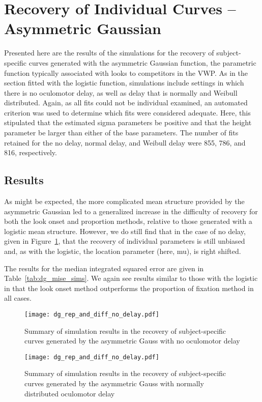 \section{Recovery of Individual Curves -- Asymmetric Gaussian}

Presented here are the results of the simulations for the recovery of subject-specific curves generated with the asymmetric Gaussian function, the parametric function typically associated with looks to competitors in the VWP. As in the section fitted with the logistic function, simulations include settings in which there is no oculomotor delay, as well as delay that is normally and Weibull distributed. Again, as all fits could not be individual examined, an automated criterion was used to determine which fits were considered  adequate. Here, this stipulated that the estimated sigma parameters be positive and that the height parameter be larger than either of the base parameters. The number of fits retained for the no delay, normal delay, and Weibull delay were  855, 786, and 816, respectively.


\subsection{Results}

As might be expected, the more complicated mean structure provided by the asymmetric Gaussian led to a generalized increase in the difficulty of recovery for both the look onset and proportion methods, relative to those generated with a logistic mean structure. However, we do still find that in the case of no delay, given in Figure~\ref{fig:dg_rep_curves_no_delay}, that the recovery of individual parameters is still unbiased and, as with the logistic, the location parameter (here, mu), is right shifted.

The results for the median integrated squared error are given in Table~\ref{tab:dg_mise_sims}. We again see results similar to those with the logistic in that the look onset method outperforms the proportion of fixation method in all cases. 

\begin{figure}[H]
\centering
\texttt{[image: dg\_rep\_and\_diff\_no\_delay.pdf]}
\caption{Summary of simulation results in the recovery of subject-specific curves generated by the asymmetric Gauss with no oculomotor delay}
\label{fig:dg_rep_curves_no_delay}
\end{figure}

\begin{figure}[H]
\centering
\texttt{[image: dg\_rep\_and\_diff\_no\_delay.pdf]}
\caption{Summary of simulation results in the recovery of subject-specific curves generated by the asymmetric Gauss with normally distributed oculomotor delay}
\label{fig:dg_rep_curves_normal_delay}
\end{figure}


